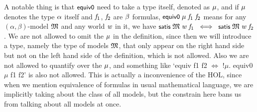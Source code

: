 \documentclass[letterpaper]{article}
\renewcommand{\HOLConst}[1]{{\textsf{\upshape\small #1}}}
\renewcommand{\HOLinline}[1]{\ensuremath{#1}}
\begin{document}
A notable thing is that \HOLinline{\HOLConst{equiv0}} need to take a type itself, denoted as \HOLinline{\HOLFreeVar{\ensuremath{\mu}}}, and if \HOLinline{\HOLFreeVar{\ensuremath{\mu}}} denotes the type \HOLinline{\HOLFreeVar{\ensuremath{\alpha}}} itself and \HOLinline{\HOLFreeVar{f\sb{\mathrm{1}}}}, \HOLinline{\HOLFreeVar{f\sb{\mathrm{2}}}} are \HOLinline{\HOLFreeVar{\ensuremath{\beta}}} formulas, \HOLinline{\HOLConst{equiv0}\;\HOLFreeVar{\ensuremath{\mu}}\;\HOLFreeVar{f\sb{\mathrm{1}}}\;\HOLFreeVar{f\sb{\mathrm{2}}}} means for any $(\alpha,\beta)$-model \HOLinline{\HOLFreeVar{\ensuremath{\mathfrak{M}}}} and any world \HOLinline{\HOLFreeVar{w}} in it, we have \HOLinline{\HOLConst{satis}\;\HOLFreeVar{\ensuremath{\mathfrak{M}}}\;\HOLFreeVar{w}\;\HOLFreeVar{f\sb{\mathrm{1}}}\;\HOLSymConst{\HOLTokenEquiv{}}\;\HOLConst{satis}\;\HOLFreeVar{\ensuremath{\mathfrak{M}}}\;\HOLFreeVar{w}\;\HOLFreeVar{f\sb{\mathrm{2}}}}. We are not allowed to omit the \HOLinline{\HOLFreeVar{\ensuremath{\mu}}} in the definition, since then we will introduce a type, namely the type of models \HOLinline{\HOLFreeVar{\ensuremath{\mathfrak{M}}}}, that only appear on the right hand side but not on the left hand side of the definition, which is not allowed. Also we are not allowed to quantify over the \HOLinline{\HOLFreeVar{\ensuremath{\mu}}}, and something like `equiv f1 f2 $\Leftrightarrow$ !$\mu$. equiv0 $\mu$ f1 f2' is also not allowed. This is actually a inconvenience of the HOL, since when we mention equivalence of formulas in usual mathematical language, we are implicitly taking about the class of all models, but the constrain here bans us from talking about all models at once.
\end{document}
